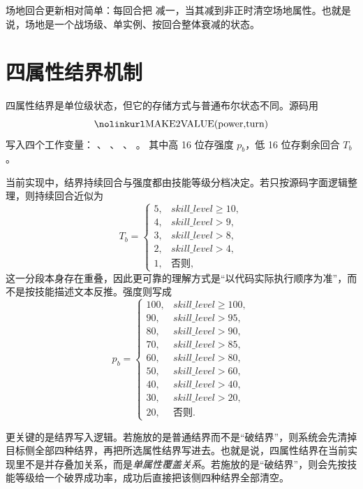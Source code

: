 场地回合更新相对简单：每回合把  减一，当其减到非正时清空场地属性。也就是说，场地是一个战场级、单实例、按回合整体衰减的状态。

\section{四属性结界机制}

四属性结界是单位级状态，但它的存储方式与普通布尔状态不同。源码用
\begin{equation}
    \code{MAKE2VALUE(power,turn)}
\end{equation}
写入四个工作变量：
、
、
、
。
其中高 16 位存强度 $p_b$，低 16 位存剩余回合 $T_b$。

当前实现中，结界持续回合与强度都由技能等级分档决定。若只按源码字面逻辑整理，则持续回合近似为
\begin{equation}
    T_b=
    \begin{cases}
        5, & skill\_level \ge 10,\\
        4, & skill\_level > 9,\\
        3, & skill\_level > 8,\\
        2, & skill\_level > 4,\\
        1, & \text{否则},
    \end{cases}
\end{equation}
这一分段本身存在重叠，因此更可靠的理解方式是“以代码实际执行顺序为准”，而不是按技能描述文本反推。强度则写成
\begin{equation}
    p_b=
    \begin{cases}
        100, & skill\_level \ge 100,\\
        90,  & skill\_level > 95,\\
        80,  & skill\_level > 90,\\
        70,  & skill\_level > 85,\\
        60,  & skill\_level > 80,\\
        50,  & skill\_level > 60,\\
        40,  & skill\_level > 40,\\
        30,  & skill\_level > 20,\\
        20,  & \text{否则}.
    \end{cases}
    \label{eq:boundary-power}
\end{equation}

更关键的是结界写入逻辑。若施放的是普通结界而不是“破结界”，则系统会先清掉目标侧全部四种结界，再把所选属性结界写进去。也就是说，四属性结界在当前实现里不是并存叠加关系，而是\emph{单属性覆盖关系}。若施放的是“破结界”，则会先按技能等级给一个破界成功率，成功后直接把该侧四种结界全部清空。

